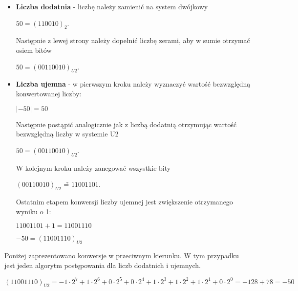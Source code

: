 \begin{itemize}
	\item \textbf{Liczba dodatnia} - liczbę należy zamienić na system dwójkowy 
	
	\begin{center}
		$50 = (110010)_2$.
	\end{center}
	
	Następnie z lewej strony należy dopełnić liczbę zerami, aby w sumie otrzymać osiem bitów
	
	\begin{center}
		$50 = (00110010)_{U2}$.
	\end{center}
	
	\item \textbf{Liczba ujemna} - w pierwszym kroku należy wyznaczyć wartość bezwzględną konwertowanej liczby:
	
	\begin{center}
		$|-50| = 50$
	\end{center}
	
	Następnie postąpić analogicznie jak z liczbą dodatnią otrzymując wartość bezwzględną liczby w systemie U2
	
	\begin{center}
		$50 = (00110010)_{U2}$.
	\end{center} 
	
	W kolejnym kroku należy zanegować wszystkie bity
	
	\begin{center}
		$(00110010)_{U2}$ \~=  $11001101$.
	\end{center} 
	
	Ostatnim etapem konwersji liczby ujemnej jest zwiększenie otrzymanego wyniku o 1:
	
	\begin{center}
		$11001101 + 1 =  11001110$
		
		$ -50 = (11001110)_{U2}$
	\end{center}
\end{itemize}

Poniżej zaprezentowano konwersje w przeciwnym kierunku. W tym przypadku jest jeden algorytm postępowania dla liczb dodatnich i ujemnych.

\begin{center}
	$(11001110)_{U2} = -1 \cdot 2^{7} + 1 \cdot 2^{6} + 0 \cdot 2^{5} + 0 \cdot 2^{4} + 1 \cdot 2^{3} + 1 \cdot 2^{2} + 1 \cdot 2^{1} + 0 \cdot 2^{0} = -128 + 78 = -50$ 
\end{center}



